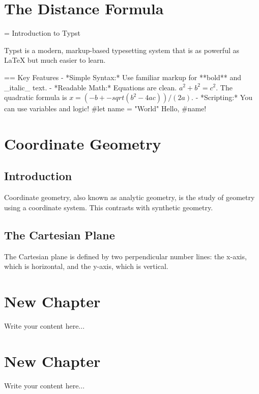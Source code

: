 \chapter{The Distance Formula}
= Introduction to Typst

Typst is a modern, markup-based typesetting system that is as powerful as LaTeX but much easier to learn.

== Key Features
- *Simple Syntax:* Use familiar markup for **bold** and _italic_ text.
- *Readable Math:* Equations are clean. $a^2 + b^2 = c^2$. The quadratic formula is $x = (-b +- sqrt(b^2 - 4a c)) / (2a)$.
- *Scripting:* You can use variables and logic!
  #let name = "World"
  Hello, #name!



\chapter{Coordinate Geometry}
\section{Introduction}
Coordinate geometry, also known as analytic geometry, is the study of geometry using a coordinate system. This contrasts with synthetic geometry.

\section{The Cartesian Plane}
The Cartesian plane is defined by two perpendicular number lines: the x-axis, which is horizontal, and the y-axis, which is vertical.

\chapter{New Chapter}
Write your content here...

\chapter{New Chapter}
Write your content here...

